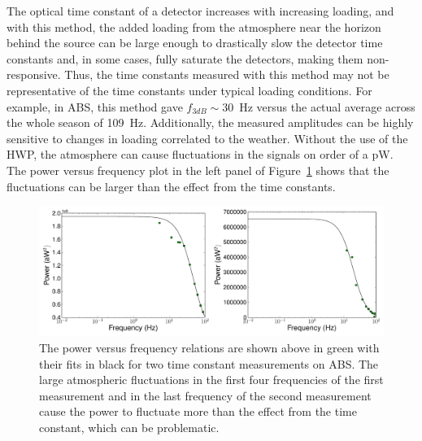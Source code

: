 The optical time constant of a detector increases with increasing loading, and with this method, the added loading from the atmosphere near the horizon behind the source can be large enough to drastically slow the detector time constants and, in some cases, fully saturate the detectors, making them non-responsive. Thus, the time constants measured with this method may not be representative of the time constants under typical loading conditions. For example, in ABS, this method gave $f_{3dB} \sim 30$~Hz versus the actual average across the whole season of 109~Hz. Additionally, the measured amplitudes can be highly sensitive to changes in loading correlated to the weather. Without the use of the HWP, the atmosphere can cause fluctuations in the signals on order of a pW. The power versus frequency plot in the left panel of Figure~\ref{fig:tc_chopper} shows that the fluctuations can be larger than the effect from the time constants.

\begin{figure}[h!]
\centering
\includegraphics[width=\textwidth]{figures/ampl_pvfreq.pdf}
\caption{The power versus frequency relations are shown above in green with their fits in black for two time constant measurements on ABS. The large atmospheric fluctuations in the first four frequencies of the first measurement and in the last frequency of the second measurement cause the power to fluctuate more than the effect from the time constant, which can be problematic.}
\label{fig:tc_chopper}
\end{figure}

